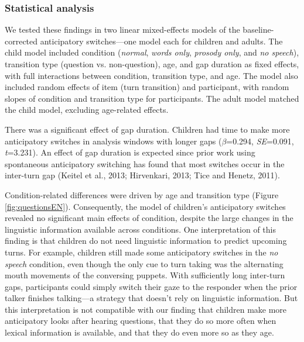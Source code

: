 \documentclass[authoryear, 12pt]{elsarticle}
\begin{document}
\subsubsection{Statistical analysis}

We tested these findings in two linear mixed-effects models of the baseline-corrected anticipatory switches---one model each for children and adults. The child model included condition (\textit{normal}, \textit{words only}, \textit{prosody only}, and \textit{no speech}), transition type (question vs. non-question), age, and gap duration as fixed effects, with full interactions between condition, transition type, and age. The model also included random effects of item (turn transition) and participant, with random slopes of condition and transition type for participants. The adult model matched the child model, excluding age-related effects.

There was a significant effect of gap duration. Children had time to make more anticipatory switches in analysis windows with longer gaps (\textit{$\beta$}=0.294, \textit{SE}=0.091, \textit{t}=3.231). An effect of gap duration is expected since prior work using spontaneous anticipatory switching has found that most switches occur in the inter-turn gap (Keitel et al., 2013; Hirvenkari, 2013; Tice and Henetz, 2011).

Condition-related differences were driven by age and transition type (Figure \ref{fig:questionsEN}). Consequently, the model of children's anticipatory switches revealed no significant main effects of condition, despite the large changes in the linguistic information available across conditions. One interpretation of this finding is that children do not need linguistic information to predict upcoming turns. For example, children still made some anticipatory switches in the \textit{no speech} condition, even though the only cue to turn taking was the alternating mouth movements of the conversing puppets. With sufficiently long inter-turn gaps, participants could simply switch their gaze to the responder when the prior talker finishes talking---a strategy that doesn't rely on linguistic information. But this interpretation is not compatible with our finding that children make more anticipatory looks after hearing questions, that they do so more often when lexical information is available, and that they do even more so as they age.
\end{document}
